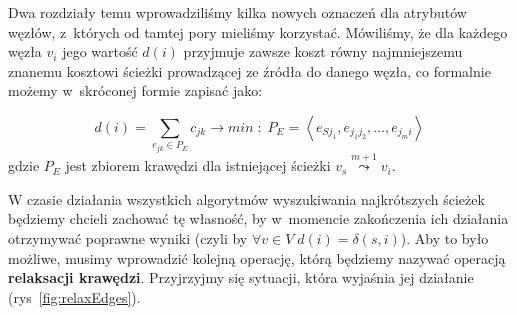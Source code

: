 Dwa rozdziały temu wprowadziliśmy kilka nowych oznaczeń dla atrybutów węzłów, z~których od tamtej pory mieliśmy korzystać.
Mówiliśmy, że dla każdego węzła $v_{i}$ jego wartość $d \left( i \right)$ przyjmuje zawsze koszt równy najmniejszemu znanemu kosztowi ścieżki prowadzącej ze źródła do danego węzła, co formalnie możemy w~skróconej formie zapisać jako:

\begin{equation}
	d \left( i \right) = \sum_{e_{jk} \in P_{E}} c_{jk} \rightarrow min\; : \; P_{E} = \left \langle e_{Sj_{1}}, e_{j_{1} j_{2}}, \dots, e_{j_{m} i } \right \rangle
\end{equation}
gdzie $P_{E}$ jest zbiorem krawędzi dla istniejącej ścieżki $v_{s} \overset{m+1}\leadsto v_{i}$.

W czasie działania wszystkich algorytmów wyszukiwania najkrótszych ścieżek będziemy chcieli zachować tę własność, by w~momencie zakończenia ich działania otrzymywać poprawne wyniki (czyli by $\forall v \in V \; d \left( i \right) = \delta \left( s, i \right)$).
Aby to było możliwe, musimy wprowadzić kolejną operację, którą będziemy nazywać operacją \textbf{relaksacji krawędzi}.
Przyjrzyjmy się sytuacji, która wyjaśnia jej działanie (rys~\ref{fig:relaxEdges}).

